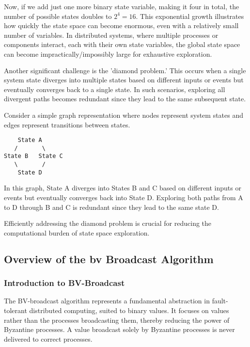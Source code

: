 \documentclass[a4paper,11pt,oneside]{report}
\begin{document}
Now, if we add just one more binary state variable, making it four in total, the number of possible states doubles to \(2^4 = 16\). This exponential growth illustrates how quickly the state space can become enormous, even with a relatively small number of variables. In distributed systems, where multiple processes or components interact, each with their own state variables, the global state space can become impractically/impossibly large for exhaustive exploration.

Another significant challenge is the 'diamond problem.' This occurs when a single system state diverges into multiple states based on different inputs or events but eventually converges back to a single state. In such scenarios, exploring all divergent paths becomes redundant since they lead to the same subsequent state. 

Consider a simple graph representation where nodes represent system states and edges represent transitions between states. 

\begin{verbatim}
    State A
   /       \
State B   State C
   \       /
    State D
\end{verbatim}

In this graph, State A diverges into States B and C based on different inputs or events but eventually converges back into State D. Exploring both paths from A to D through B and C is redundant since they lead to the same state D.

Efficiently addressing the diamond problem is crucial for reducing the computational burden of state space exploration.

\subsection{Overview of the bv Broadcast Algorithm}

\subsubsection{Introduction to BV-Broadcast}
The BV-broadcast algorithm represents a fundamental abstraction in fault-tolerant distributed computing, suited to binary values. It focuses on values rather than the processes broadcasting them, thereby reducing the power of Byzantine processes. A value broadcast solely by Byzantine processes is never delivered to correct processes. 
\end{document}
